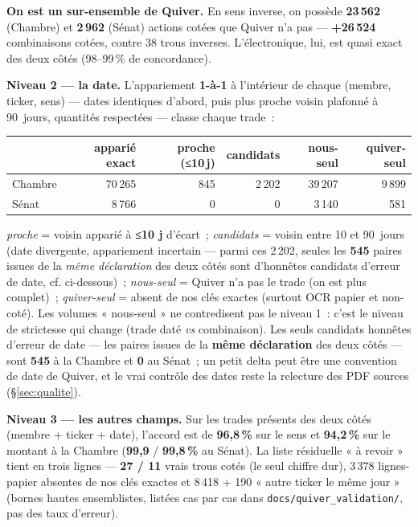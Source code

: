\documentclass[11pt,a4paper]{article}
\newcommand{\co}[1]{\texttt{\small #1}}
\begin{document}
\textbf{On est un sur-ensemble de Quiver.} En sens inverse, on possède \textbf{23\,562} (Chambre) et
\textbf{2\,962} (Sénat) actions cotées que Quiver n'a pas — \textbf{+26\,524} combinaisons cotées, contre
38 trous inverses. L'électronique, lui, est quasi exact des deux côtés (98--99\,\% de concordance).

\textbf{Niveau 2 — la date.} L'appariement \textbf{1-à-1} à l'intérieur de chaque (membre, ticker, sens) —
dates identiques d'abord, puis plus proche voisin plafonné à 90~jours, quantités respectées — classe chaque
trade~:
\begin{center}\small
\begin{tabular}{l rrrrr}
\toprule
& \bfseries apparié exact & \bfseries proche (≤10\,j) & \bfseries candidats & \bfseries nous-seul & \bfseries quiver-seul\\
\midrule
Chambre & 70\,265 & 845 & 2\,202 & 39\,207 & 9\,899 \\
Sénat & 8\,766 & 0 & 0 & 3\,140 & 581 \\
\bottomrule
\end{tabular}
\end{center}
{\footnotesize \emph{proche} = voisin apparié à \textbf{≤10 j} d'écart~; \emph{candidats} = voisin entre 10 et 90~jours (date divergente, appariement incertain — parmi ces 2\,202, seules les \textbf{545} paires issues de la \emph{même déclaration} des deux côtés sont d'honnêtes candidats d'erreur de date, cf. ci-dessous)~; \emph{nous-seul} = Quiver n'a pas le trade (on est plus complet)~; \emph{quiver-seul} = absent de nos clés exactes (surtout OCR papier et non-coté). Les volumes « nous-seul » ne contredisent pas le niveau 1~: c'est le niveau de strictesse qui change (trade daté \emph{vs} combinaison).}
Les seuls candidats honnêtes d'erreur de date — les paires issues de la \textbf{même déclaration} des deux
côtés — sont \textbf{545} à la Chambre et \textbf{0} au Sénat~; un petit delta peut être une convention de
date de Quiver, et le vrai contrôle des dates reste la relecture des PDF sources (\S{}\ref{sec:qualite}).

\textbf{Niveau 3 — les autres champs.} Sur les trades présents des deux côtés (membre + ticker + date),
l'accord est de \textbf{96,8\,\%} sur le sens et \textbf{94,2\,\%} sur le montant à la Chambre
(\textbf{99,9} / \textbf{99,8\,\%} au Sénat). La liste résiduelle « à revoir » tient en trois lignes —
\textbf{27 / 11} vrais trous cotés (le seul chiffre dur), 3\,378 lignes-papier absentes de nos clés exactes
et 8\,418 + 190 « autre ticker le même jour » (bornes hautes ensemblistes, listées cas par cas dans
\co{docs/quiver_validation/}, pas des taux d'erreur).
\end{document}
